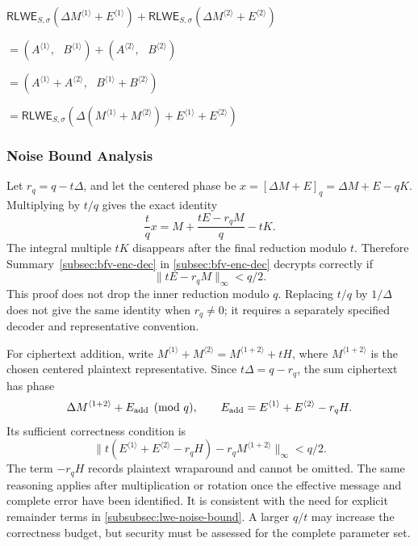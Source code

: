 \begin{tcolorbox}[title={\textbf{\tboxlabel{\ref*{subsec:bfv-add-cipher}} BFV Ciphertext-to-Ciphertext Addition}}]
$\textsf{RLWE}_{S, \sigma}(\Delta M^{\langle 1 \rangle} + E^{\langle 1 \rangle} ) + \textsf{RLWE}_{S, \sigma}(\Delta M^{\langle 2 \rangle} + E^{\langle 2 \rangle}) $

$ = ( A^{\langle 1 \rangle}, \text{ } B^{\langle 1 \rangle}) + (A^{\langle 2 \rangle}, \text{ } B^{\langle 2 \rangle}) $

$ = ( A^{\langle 1 \rangle} + A^{\langle 2 \rangle}, \text{ } B^{\langle 1 \rangle} + B^{\langle 2 \rangle} ) $

$= \textsf{RLWE}_{S, \sigma}(\Delta(M^{\langle 1 \rangle} + M^{\langle 2 \rangle}) + E^{\langle 1 \rangle} + E^{\langle 2 \rangle})$
\end{tcolorbox}


\subsubsection{Noise Bound Analysis}
\label{subsubsec:bfv-noise-analysis}

Let $r_q=q-t\Delta$, and let the centered phase be $x=[\Delta M+E]_q=\Delta M+E-qK$. Multiplying by $t/q$ gives the exact identity
\[
\frac{t}{q}x=M+\frac{tE-r_qM}{q}-tK.
\]
The integral multiple $tK$ disappears after the final reduction modulo $t$. Therefore Summary~\ref*{subsec:bfv-enc-dec} in \autoref{subsec:bfv-enc-dec} decrypts correctly if
\[
\|tE-r_qM\|_\infty<q/2.
\]
This proof does not drop the inner reduction modulo $q$. Replacing $t/q$ by $1/\Delta$ does not give the same identity when $r_q\ne0$; it requires a separately specified decoder and representative convention.

For ciphertext addition, write $M^{\langle1\rangle}+M^{\langle2\rangle}=M^{\langle1+2\rangle}+tH$, where $M^{\langle1+2\rangle}$ is the chosen centered plaintext representative. Since $t\Delta=q-r_q$, the sum ciphertext has phase
\[
\Delta M^{\langle1+2\rangle}+E_{\rm add}\pmod q,
\qquad E_{\rm add}=E^{\langle1\rangle}+E^{\langle2\rangle}-r_qH.
\]
Its sufficient correctness condition is
\[
\bigl\|t(E^{\langle1\rangle}+E^{\langle2\rangle}-r_qH)-r_qM^{\langle1+2\rangle}\bigr\|_\infty<q/2.
\]
The term $-r_qH$ records plaintext wraparound and cannot be omitted. The same reasoning applies after multiplication or rotation once the effective message and complete error have been identified. It is consistent with the need for explicit remainder terms in \autoref{subsubsec:lwe-noise-bound}. A larger $q/t$ may increase the correctness budget, but security must be assessed for the complete parameter set.

